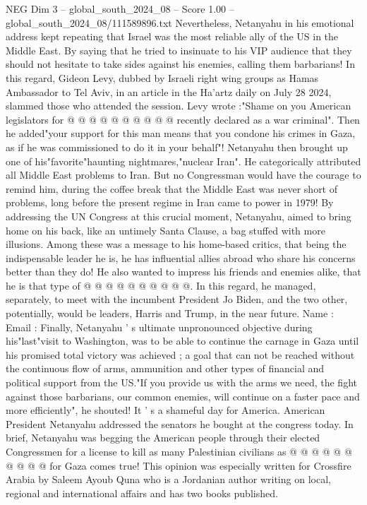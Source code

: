 \begin{textsample}{NEG Dim 3 – global\_south\_2024\_08 – Score 1.00 – global\_south\_2024\_08/111589896.txt}
Nevertheless, Netanyahu in his emotional address kept repeating that Israel was the most reliable ally of the US in the Middle East.
By saying that he tried to insinuate to his VIP audience that they should not hesitate to take sides against his enemies, calling them barbarians!
In this regard, Gideon Levy, dubbed by Israeli right wing groups as Hamas Ambassador to Tel Aviv, in an article in the Ha'artz daily on July 28 2024, slammed those who attended the session.
Levy wrote :"Shame on you American legislators for @ @ @ @ @ @ @ @ @ @ recently declared as a war criminal".
Then he added"your support for this man means that you condone his crimes in Gaza, as if he was commissioned to do it in your behalf"!
Netanyahu then brought up one of his"favorite"haunting nightmares,"nuclear Iran".
He categorically attributed all Middle East problems to Iran.
But no Congressman would have the courage to remind him, during the coffee break that the Middle East was never short of problems, long before the present regime in Iran came to power in 1979!
By addressing the UN Congress at this crucial moment, Netanyahu, aimed to bring home on his back, like an untimely Santa Clause, a bag stuffed with more illusions.
Among these was a message to his home-based critics, that being the indispensable leader he is, he has influential allies abroad who share his concerns better than they do!
He also wanted to impress his friends and enemies alike, that he is that type of @ @ @ @ @ @ @ @ @ @.
In this regard, he managed, separately, to meet with the incumbent President Jo Biden, and the two other, potentially, would be leaders, Harris and Trump, in the near future.
Name : Email : Finally, Netanyahu ' s ultimate unpronounced objective during his"last"visit to Washington, was to be able to continue the carnage in Gaza until his promised total victory was achieved ; a goal that can not be reached without the continuous flow of arms, ammunition and other types of financial and political support from the US."If you provide us with the arms we need, the fight against those barbarians, our common enemies, will continue on a faster pace and more efficiently", he shouted!
It ' s a shameful day for America.
American President Netanyahu addressed the senators he bought at the congress today.
In brief, Netanyahu was begging the American people through their elected Congressmen for a license to kill as many Palestinian civilians as @ @ @ @ @ @ @ @ @ @ for Gaza comes true!
This opinion was especially written for Crossfire Arabia by Saleem Ayoub Quna who is a Jordanian author writing on local, regional and international affairs and has two books published.

\end{textsample}
